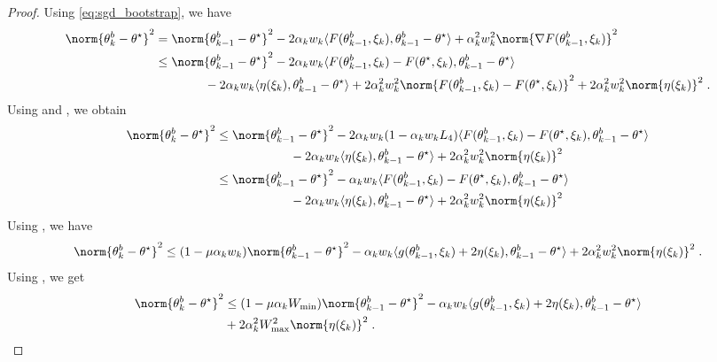 \begin{proof}
Using \eqref{eq:sgd_bootstrap}, we have
\begin{align}
    \norm{\theta_k^b-\thetas}^2 &= \norm{\theta_{k-1}^b-\thetas}^2 - 2\alpha_kw_k\langle  F(\theta_{k-1}^b, \xi_k), \theta_{k-1}^b-\thetas \rangle + \alpha_k^2w_k^2\norm{\nabla F(\theta_{k-1}^b, \xi_k)}^2 \\& \leq
    \norm{\theta_{k-1}^b-\thetas}^2 - 2\alpha_kw_k\langle   F(\theta_{k-1}^b, \xi_k)-  F(\thetas, \xi_k), \theta_{k-1}^b-\thetas \rangle \\& \qquad \qquad- 2\alpha_kw_k\langle \eta(\xi_k), \theta_{k-1}^b-\thetas \rangle+  2\alpha_k^2w_k^2\norm{ F(\theta_{k-1}^b, \xi_k)- F(\thetas, \xi_k)}^2 + 2\alpha_k^2w_k^2\norm{\eta(\xi_k)}^2 \eqsp.
\end{align}
Using  and , we obtain 
\begin{align}
     \norm{\theta_k^b-\thetas}^2 &\leq \norm{\theta_{k-1}^b-\thetas}^2 - 2\alpha_kw_k(1-\alpha_kw_kL_4)\langle   F(\theta_{k-1}^b, \xi_k)-  F(\thetas, \xi_k), \theta_{k-1}^b-\thetas \rangle \\& \qquad \qquad \qquad - 2\alpha_kw_k\langle \eta(\xi_k), \theta_{k-1}^b-\thetas \rangle + 2\alpha_k^2w_k^2\norm{\eta(\xi_k)}^2 \\&\leq  \norm{\theta_{k-1}^b-\thetas}^2 - \alpha_kw_k\langle   F(\theta_{k-1}^b, \xi_k)-  F(\thetas, \xi_k), \theta_{k-1}^b-\thetas \rangle \\& \qquad \qquad \qquad - 2\alpha_kw_k\langle \eta(\xi_k), \theta_{k-1}^b-\thetas \rangle + 2\alpha_k^2w_k^2\norm{\eta(\xi_k)}^2
\end{align}
 Using  , we have
\begin{equation}
    \norm{\theta_k^b-\thetas}^2 \leq
    (1-\mu\alpha_kw_k)\norm{\theta_{k-1}^b-\thetas}^2 - \alpha_kw_k\langle g(\theta_{k-1}^b,\xi_k)+2\eta(\xi_k), \theta_{k-1}^b-\thetas \rangle + 2\alpha_k^2w_k^2\norm{\eta(\xi_k)}^2 \eqsp.
\end{equation}
Using , we get 
\begin{equation}
\label{eq:last_iter_reccurrence_high_prob}
\begin{split}
    \norm{\theta_k^b-\thetas}^2 &\leq
    (1-\mu\alpha_kW_{\min})\norm{\theta_{k-1}^b-\thetas}^2 - \alpha_kw_k\langle g(\theta_{k-1}^b,\xi_k)+2\eta(\xi_k), \theta_{k-1}^b-\thetas \rangle \\
    & + 2\alpha_k^2W_{\max}^2\norm{\eta(\xi_k)}^2 \eqsp.

\end{split}
\end{equation}
\end{proof}
